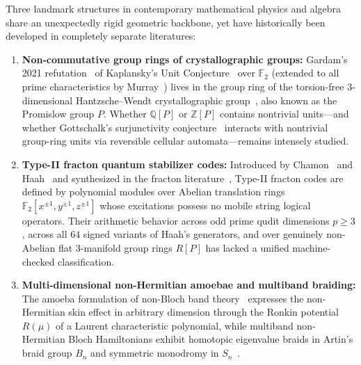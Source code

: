 \documentclass[11pt,reqno]{amsart}
\theoremstyle{definition}
\newcommand{\Z}{\mathbb{Z}}
\newcommand{\Q}{\mathbb{Q}}
\newcommand{\F}{\mathbb{F}}
\begin{document}
Three landmark structures in contemporary mathematical physics and algebra share an unexpectedly
rigid geometric backbone, yet have historically been developed in completely separate literatures:
\begin{enumerate}[leftmargin=2em]
  \item \textbf{Non-commutative group rings of crystallographic groups:} Gardam's 2021
    refutation~\cite{gardam2021counterexample} of Kaplansky's Unit Conjecture~\cite{kaplansky1970problems}
    over $\F_2$ (extended to all prime characteristics by Murray~\cite{murray2021more}) lives in the
    group ring of the torsion-free $3$-dimensional Hantzsche--Wendt crystallographic
    group~\cite{hantzsche1935dreidimensionale,promislow1988simple}, also known as the Promislow
    group $P$. Whether $\Q[P]$ or $\Z[P]$ contains nontrivial units---and whether Gottschalk's
    surjunctivity conjecture~\cite{gottschalk1973some,gromov1999endomorphisms} interacts with
    nontrivial group-ring units via reversible cellular automata---remains intensely studied.
  \item \textbf{Type-II fracton quantum stabilizer codes:} Introduced by Chamon~\cite{chamon2005quantum}
    and Haah~\cite{haah2011local,haah2013commuting} and synthesized in the fracton
    literature~\cite{vijay2016fracton,dua2019compactifying,nandkishore2019fractons}, Type-II
    fracton codes are defined by polynomial modules over Abelian translation rings
    $\F_2[x^{\pm 1},y^{\pm 1},z^{\pm 1}]$ whose excitations possess no mobile string logical
    operators. Their arithmetic behavior across odd prime qudit dimensions $p \ge 3$, across all
    $64$ signed variants of Haah's generators, and over genuinely non-Abelian flat $3$-manifold
    group rings $R[P]$ has lacked a unified machine-checked classification.
  \item \textbf{Multi-dimensional non-Hermitian amoebae and multiband braiding:} The amoeba
    formulation of non-Bloch band theory~\cite{passare2004amoebas,wang2024amoeba} expresses the
    non-Hermitian skin effect in arbitrary dimension through the Ronkin potential $R(\mu)$ of a
    Laurent characteristic polynomial, while multiband non-Hermitian Bloch Hamiltonians exhibit
    homotopic eigenvalue braids in Artin's braid group $B_n$ and symmetric monodromy in
    $S_n$~\cite{wojcik2020homotopy,hu2021knots,bergholtz2021exceptional}.
\end{enumerate}
\end{document}

